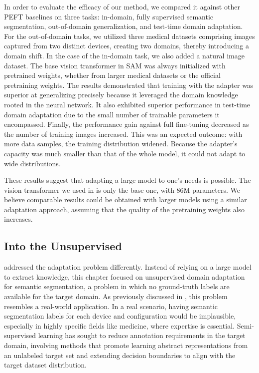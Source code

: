In order to evaluate the efficacy of our method, we compared it against other PEFT baselines on three tasks: in-domain, fully supervised semantic segmentation, out-of-domain generalization, and test-time domain adaptation. For the out-of-domain tasks, we utilized three medical datasets comprising images captured from two distinct devices, creating two domains, thereby introducing a domain shift. In the case of the in-domain task, we also added a natural image dataset. The base vision transformer in SAM was always initialized with pretrained weights, whether from larger medical datasets or the official pretraining weights. The results demonstrated that training with the adapter was superior at generalizing precisely because it leveraged the domain knowledge rooted in the neural network. It also exhibited superior performance in test-time domain adaptation due to the small number of trainable parameters it encompassed. Finally, the performance gain against full fine-tuning decreased as the number of training images increased. This was an expected outcome: with more data samples, the training distribution widened. Because the adapter's capacity was much smaller than that of the whole model, it could not adapt to wide distributions.

These results suggest that adapting a large model to one's needs is possible. The vision transformer we used in  is only the base one, with 86M parameters. We believe comparable results could be obtained with larger models using a similar adaptation approach, assuming that the quality of the pretraining weights also increases. 

\subsection{Into the Unsupervised}
 addressed the adaptation problem differently. Instead of relying on a large model to extract knowledge, this chapter focused on unsupervised domain adaptation for semantic segmentation, a problem in which no ground-truth labels are available for the target domain. As previously discussed in , this problem resembles a real-world application. In a real scenario, having semantic segmentation labels for each device and configuration would be implausible, especially in highly specific fields like medicine, where expertise is essential. Semi-supervised learning has sought to reduce annotation requirements in the target domain, involving methods that promote learning abstract representations from an unlabeled target set and extending decision boundaries to align with the target dataset distribution.

